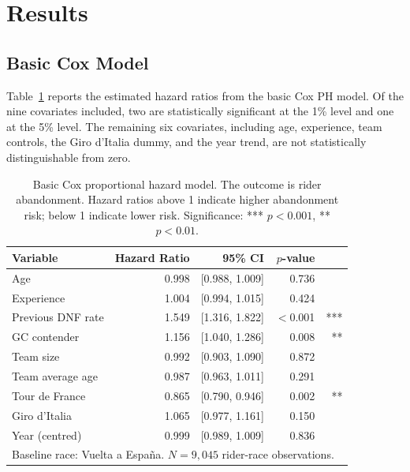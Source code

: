 \section{Results}
\label{sec:results}

\subsection{Basic Cox Model}

Table~\ref{tab:cox_basic} reports the estimated hazard ratios from the basic Cox PH model. Of the nine covariates included, two are statistically significant at the 1\% level and one at the 5\% level. The remaining six covariates, including age, experience, team controls, the Giro d'Italia dummy, and the year trend, are not statistically distinguishable from zero.

\begin{table}[H]
\centering
\caption{Basic Cox proportional hazard model. The outcome is rider abandonment. Hazard ratios above 1 indicate higher abandonment risk; below 1 indicate lower risk. Significance: *** $p<0.001$, ** $p<0.01$.}
\label{tab:cox_basic}
\small
\renewcommand{\arraystretch}{1.3}
\begin{tabular}{@{} lrrrr @{}}
\toprule
Variable & Hazard Ratio & 95\% CI & $p$-value & \\
\midrule
Age                 & 0.998 & [0.988, 1.009] & 0.736 & \\
Experience          & 1.004 & [0.994, 1.015] & 0.424 & \\
Previous DNF rate   & 1.549 & [1.316, 1.822] & $<$0.001 & *** \\
GC contender        & 1.156 & [1.040, 1.286] & 0.008 & ** \\
Team size           & 0.992 & [0.903, 1.090] & 0.872 & \\
Team average age    & 0.987 & [0.963, 1.011] & 0.291 & \\
Tour de France      & 0.865 & [0.790, 0.946] & 0.002 & ** \\
Giro d'Italia       & 1.065 & [0.977, 1.161] & 0.150 & \\
Year (centred)      & 0.999 & [0.989, 1.009] & 0.836 & \\
\bottomrule
\multicolumn{5}{l}{\footnotesize Baseline race: Vuelta a Espa\~{n}a. $N = 9{,}045$ rider-race observations.}
\end{tabular}
\end{table}

